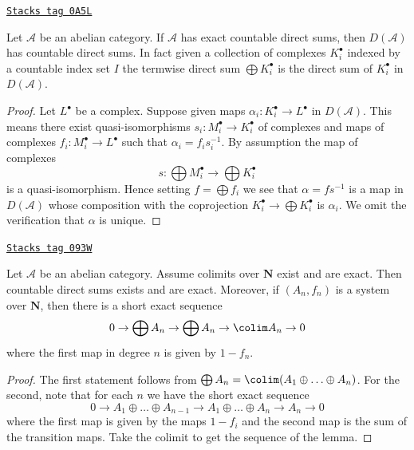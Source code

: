 \begin{lemma}
\label{derived-lemma-direct-sums}
\href{https://stacks.math.columbia.edu/tag/0A5L}{\texttt{Stacks tag 0A5L}}

Let $\mathcal{A}$ be an abelian category.
If $\mathcal{A}$ has exact countable direct sums, then
$D(\mathcal{A})$ has countable direct sums. In fact given
a collection of complexes $K_i^\bullet$ indexed by a countable
index set $I$ the termwise direct sum $\bigoplus K_i^\bullet$
is the direct sum of $K_i^\bullet$ in $D(\mathcal{A})$.
\end{lemma}

\begin{proof}
Let $L^\bullet$ be a complex. Suppose given maps
$\alpha_i : K_i^\bullet \to L^\bullet$ in $D(\mathcal{A})$.
This means there exist quasi-isomorphisms
$s_i : M_i^\bullet \to K_i^\bullet$
of complexes and maps of complexes $f_i : M_i^\bullet \to L^\bullet$
such that $\alpha_i = f_is_i^{-1}$. By assumption the map of complexes
$$
s : \bigoplus M_i^\bullet \longrightarrow \bigoplus K_i^\bullet
$$
is a quasi-isomorphism. Hence setting $f = \bigoplus f_i$ we see that
$\alpha = fs^{-1}$ is a map in $D(\mathcal{A})$ whose composition
with the coprojection $K_i^\bullet \to \bigoplus K_i^\bullet$ is $\alpha_i$.
We omit the verification that $\alpha$ is unique.
\end{proof}

\begin{lemma}
\label{derived-lemma-compute-colimit}
\href{https://stacks.math.columbia.edu/tag/093W}{\texttt{Stacks tag 093W}}

Let $\mathcal{A}$ be an abelian category. Assume colimits over $\mathbf{N}$
exist and are exact. Then countable direct sums exists and are exact.
Moreover, if $(A_n, f_n)$ is a system over $\mathbf{N}$, then there is
a short exact sequence
$$
0 \to \bigoplus A_n \to \bigoplus A_n \to \colim A_n \to 0
$$
where the first map in degree $n$ is given by $1 - f_n$.
\end{lemma}

\begin{proof}
The first statement follows from
$\bigoplus A_n = \colim (A_1 \oplus \ldots \oplus A_n)$.
For the second, note that for each $n$ we have the short exact sequence
$$
0 \to
A_1 \oplus \ldots \oplus A_{n - 1} \to
A_1 \oplus \ldots \oplus A_n \to A_n \to 0
$$
where the first map is given by the maps $1 - f_i$ and the
second map is the sum of the transition maps.
Take the colimit to get the sequence of the lemma.
\end{proof}

